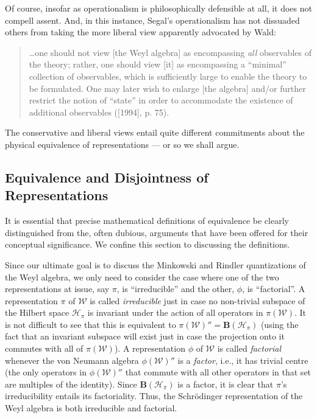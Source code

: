 \documentclass[12pt]{article}
\theoremstyle{remark}
\theoremstyle{definition}
\newcommand{\alg}[1]{\mathcal{#1}}
\newcommand{\hil}[1]{\mathcal{#1}}
\begin{document}
  Of course, insofar as operationalism is philosophically 
  defensible at all, it does not compell assent.  And, in this instance, 
  Segal's operationalism has not dissuaded
  others from taking 
  the more liberal view apparently advocated by Wald: 
  \begin{quote}
\ldots one should not view [the Weyl algebra] as encompassing \textit{all}
observables of the theory; rather, one should view [it] as encompassing a
``minimal'' collection of observables, which is sufficiently large to enable
the theory to be formulated. One may later wish to enlarge [the algebra]
and/or further restrict the notion of ``state'' in order to accommodate the
existence of additional observables ([1994], p. 75).
\end{quote}
\noindent The conservative and liberal views 
entail quite different commitments about the physical equivalence 
of representations --- or so we shall argue.  

\subsection{Equivalence and Disjointness of Representations}
It is essential that precise mathematical definitions of 
equivalence be clearly distinguished from the, often dubious, arguments that 
have been offered for their conceptual significance.  We confine this 
section to discussing the definitions. 

Since our ultimate goal is to discuss the 
Minkowski and Rindler quantizations of the Weyl algebra, we only need 
to consider the case where one of the two representations at 
issue, say $\pi$, is ``irreducible'' and the other, $\phi$, is ``factorial''. 
A representation $\pi$ of $\alg{W}$ is called \emph{irreducible}
just in case no non-trivial subspace of the Hilbert space
$\hil{H}_{\pi}$ is invariant under the action of all operators
in $\pi(\alg{W})$.  It is not difficult to see that this is equivalent to 
$\pi(\alg{W})''=\mathbf{B}(\hil{H}_{\pi})$ (using the fact that 
an invariant subspace will exist just in case 
the projection onto it commutes with all of $\pi(\alg{W})$). 
A representation $\phi$ of $\alg{W}$ is called \emph{factorial}
whenever the von Neumann algebra $\phi(\alg{W})''$ is a \emph{factor}, 
i.e., it has trivial centre (the only operators in $\phi(\alg{W})''$ that 
commute with all other operators in that set are multiples of the 
identity).  Since $\mathbf{B}(\hil{H}_{\pi})$ is a factor, it is 
clear that $\pi$'s irreducibility entails its factoriality.  
Thus, the Schr\"{o}dinger representation of the Weyl algebra is both 
irreducible and factorial.   
\end{document}
